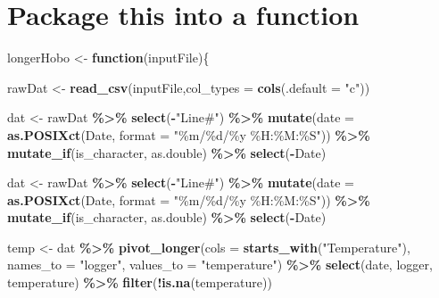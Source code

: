 \documentclass[]{article}
\newenvironment{Shaded}{\begin{snugshade}}{\end{snugshade}}
\newcommand{\ControlFlowTok}[1]{\textcolor[rgb]{0.13,0.29,0.53}{\textbf{#1}}}
\newcommand{\DataTypeTok}[1]{\textcolor[rgb]{0.13,0.29,0.53}{#1}}
\newcommand{\KeywordTok}[1]{\textcolor[rgb]{0.13,0.29,0.53}{\textbf{#1}}}
\newcommand{\NormalTok}[1]{#1}
\newcommand{\OperatorTok}[1]{\textcolor[rgb]{0.81,0.36,0.00}{\textbf{#1}}}
\newcommand{\StringTok}[1]{\textcolor[rgb]{0.31,0.60,0.02}{#1}}
\begin{document}
\hypertarget{package-this-into-a-function}{%
\section{Package this into a
function}\label{package-this-into-a-function}}

\begin{Shaded}
\begin{Highlighting}[]
\NormalTok{longerHobo <{-}}\StringTok{ }\ControlFlowTok{function}\NormalTok{(inputFile)\{}
  
\NormalTok{  rawDat <{-}}\StringTok{ }\KeywordTok{read\_csv}\NormalTok{(inputFile,}\DataTypeTok{col\_types =} \KeywordTok{cols}\NormalTok{(}\DataTypeTok{.default =} \StringTok{"c"}\NormalTok{))}

\NormalTok{  dat <{-}}\StringTok{ }\NormalTok{rawDat }\OperatorTok{\%>\%}\StringTok{  }
\StringTok{    }\KeywordTok{select}\NormalTok{(}\OperatorTok{{-}}\StringTok{"Line\#"}\NormalTok{) }\OperatorTok{\%>\%}\StringTok{ }
\StringTok{    }\KeywordTok{mutate}\NormalTok{(}\DataTypeTok{date =} \KeywordTok{as.POSIXct}\NormalTok{(Date, }\DataTypeTok{format =} \StringTok{"\%m/\%d/\%y \%H:\%M:\%S"}\NormalTok{)) }\OperatorTok{\%>\%}\StringTok{ }
\StringTok{    }\KeywordTok{mutate\_if}\NormalTok{(is\_character, as.double) }\OperatorTok{\%>\%}\StringTok{ }
\StringTok{    }\KeywordTok{select}\NormalTok{(}\OperatorTok{{-}}\NormalTok{Date)}

\NormalTok{    dat <{-}}\StringTok{ }\NormalTok{rawDat }\OperatorTok{\%>\%}\StringTok{  }
\StringTok{  }\KeywordTok{select}\NormalTok{(}\OperatorTok{{-}}\StringTok{"Line\#"}\NormalTok{) }\OperatorTok{\%>\%}\StringTok{ }
\StringTok{  }\KeywordTok{mutate}\NormalTok{(}\DataTypeTok{date =} \KeywordTok{as.POSIXct}\NormalTok{(Date, }\DataTypeTok{format =} \StringTok{"\%m/\%d/\%y \%H:\%M:\%S"}\NormalTok{)) }\OperatorTok{\%>\%}\StringTok{ }
\StringTok{  }\KeywordTok{mutate\_if}\NormalTok{(is\_character, as.double) }\OperatorTok{\%>\%}\StringTok{ }
\StringTok{  }\KeywordTok{select}\NormalTok{(}\OperatorTok{{-}}\NormalTok{Date)}
 
   
\NormalTok{  temp <{-}}\StringTok{ }\NormalTok{dat }\OperatorTok{\%>\%}\StringTok{ }
\StringTok{    }\KeywordTok{pivot\_longer}\NormalTok{(}\DataTypeTok{cols =} \KeywordTok{starts\_with}\NormalTok{(}\StringTok{"Temperature"}\NormalTok{),}
               \DataTypeTok{names\_to =} \StringTok{"logger"}\NormalTok{,}
               \DataTypeTok{values\_to =} \StringTok{"temperature"}\NormalTok{) }\OperatorTok{\%>\%}\StringTok{ }
\StringTok{    }\KeywordTok{select}\NormalTok{(date,}
\NormalTok{         logger,}
\NormalTok{         temperature) }\OperatorTok{\%>\%}\StringTok{ }
\StringTok{    }\KeywordTok{filter}\NormalTok{(}\OperatorTok{!}\KeywordTok{is.na}\NormalTok{(temperature))}


\end{Highlighting}
\end{Shaded}
\end{document}
